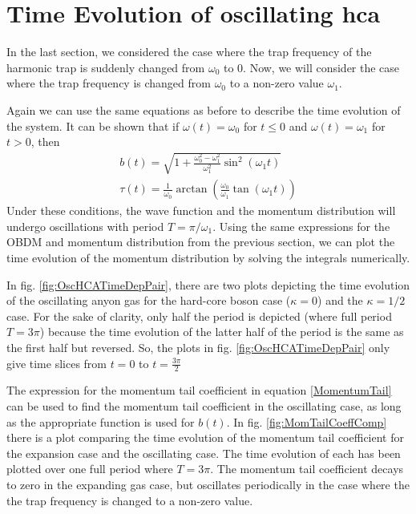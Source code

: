 \documentclass[onecolumn,english,aps,pra]{revtex4}
\begin{document}
\section{Time Evolution of oscillating hca}

In the last section, we considered the case where the trap frequency of the harmonic trap is suddenly changed from $\omega_0$ to 0. Now, we will consider the case where the trap frequency is changed from $\omega_0$ to a non-zero value $\omega_1$.

Again we can use the same equations as before to describe the time evolution of the system. It can be shown that if $\omega(t) = \omega_0$ for $t \leq 0$ and $\omega(t) = \omega_1$ for $t > 0$, then
\begin{align*}
b(t) = \sqrt{1 + \frac{\omega_0^2 - \omega_1^2}{\omega_1^2} \sin^2(\omega_1 t)}\\
\tau(t) = \frac{1}{\omega_0} \arctan\left(\frac{\omega_0}{\omega_1} \tan(\omega_1 t)\right)
\end{align*}
Under these conditions, the wave function and the momentum distribution will undergo oscillations with period $T = \pi/\omega_1$. Using the same expressions for the OBDM and momentum distribution from the previous section, we can plot the time evolution of the momentum distribution by solving the integrals numerically. 

In fig. \ref{fig:OscHCATimeDepPair}, there are two plots depicting the time evolution of the oscillating anyon gas for the hard-core boson case ($\kappa = 0$) and the $\kappa = 1/2$ case. For the sake of clarity, only half the period is depicted (where full period $T = 3\pi$) because the time evolution of the latter half of the period is the same as the first half but reversed. So, the plots in fig. \ref{fig:OscHCATimeDepPair} only give time slices from $t = 0$ to $t = \frac{3\pi}{2}$ 

The expression for the momentum tail coefficient in equation \ref{MomentumTail} can be used to find the momentum tail coefficient in the oscillating case, as long as the appropriate function is used for $b(t)$. In fig. \ref{fig:MomTailCoeffComp} there is a plot comparing the time evolution of the momentum tail coefficient for the expansion case and the oscillating case. The time evolution of each has been plotted over one full period where $T = 3\pi$. The momentum tail coefficient decays to zero in the expanding gas case, but oscillates periodically in the case where the the trap frequency is changed to a non-zero value.
\end{document}
